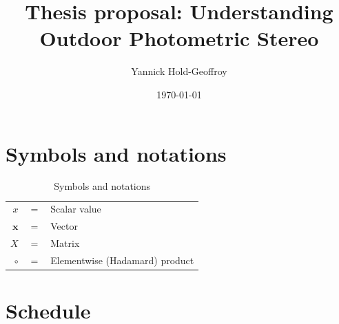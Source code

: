 \documentclass{report}
\title{Thesis proposal: Understanding Outdoor Photometric Stereo}
\author{Yannick Hold-Geoffroy}
\date{\today}
\begin{document}

\maketitle

\tableofcontents

\hypersetup{colorlinks=true,linkcolor=blue}

\newcommand{\boldomega}{\boldsymbol \omega} %
\newcommand{\boldmu}{\boldsymbol \mu} %
\newcommand{\bolddelta}{\boldsymbol \delta} %

\newcommand\norm[1]{\left\lVert#1\right\rVert}

\newcommand\todo[1]{\textcolor{red}{TODO: #1}}

\graphicspath{{figures/}}


\chapter*{Symbols and notations}

\begin{table}[htbp]\caption{Symbols and notations}
\centering %
\begin{tabular}{r c p{10cm} }

\hline %
$x$                                 & $=$ & Scalar value \\
$\mathbf{x}$                        & $=$ & Vector \\
$X$                                 & $=$ & Matrix \\
$\circ$                             & $=$ & Elementwise (Hadamard) product \\
\hline
\end{tabular}
\label{tab:TableOfNotationForMyResearch}
\end{table}








\chapter{Schedule}
\end{document}
